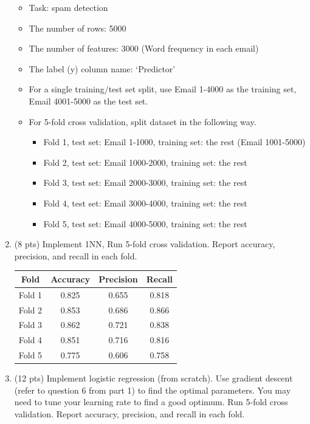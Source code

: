 \documentclass[a4paper]{article}
\theoremstyle{definition}
\newenvironment{soln}{
    \leavevmode\color{blue}\ignorespaces
}{}
\begin{document}
\begin{enumerate}
	\begin{itemize}
		\item Task: spam detection
		\item The number of rows: 5000
		\item The number of features: 3000 (Word frequency in each email)
		\item The label (y) column name: `Predictor'
		\item For a single training/test set split, use Email 1-4000 as the training set, Email 4001-5000 as the test set.
		\item For 5-fold cross validation, split dataset in the following way.
		\begin{itemize}
			\item Fold 1, test set: Email 1-1000, training set: the rest (Email 1001-5000)
			\item Fold 2, test set: Email 1000-2000, training set: the rest
			\item Fold 3, test set: Email 2000-3000, training set: the rest
			\item Fold 4, test set: Email 3000-4000, training set: the rest
			\item Fold 5, test set: Email 4000-5000, training set: the rest			
		\end{itemize}
	\end{itemize}
	
	\item (8 pts) Implement 1NN, Run 5-fold cross validation. Report accuracy, precision, and recall in each fold.
	
	\begin{soln}
		\begin{center}
			\begin{tabular}{ c  c  c  c }
				\hline
				Fold & Accuracy & Precision & Recall \\ \hline
				Fold 1 & 0.825 & 0.655 & 0.818 \\
				Fold 2 & 0.853 & 0.686 & 0.866 \\
				Fold 3 & 0.862 & 0.721 & 0.838 \\
				Fold 4 & 0.851 & 0.716 & 0.816 \\
				Fold 5 & 0.775 & 0.606 & 0.758 \\
				\hline
			\end{tabular}
		\end{center}
	\end{soln}
	
	\item (12 pts) Implement logistic regression (from scratch). Use gradient descent (refer to question 6 from part 1) to find the optimal parameters. You may need to tune your learning rate to find a good optimum. Run 5-fold cross validation. Report accuracy, precision, and recall in each fold.
	

\end{enumerate}
\end{document}
